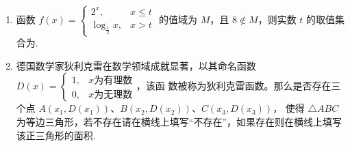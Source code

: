 \documentclass[a4paper,11pt]{article}
\begin{document}
\begin{enumerate}
\ifanswer
\solbegin
{}
\solend

\fi

\item 函数 $f(x)=\begin{cases}2^x, & x\leqslant t\\ \log_\frac12x, & x>t\end{cases}$ 的值域为 $M$，且 $8\notin M$，则实数 $t$ 的取值集合为\blankline[4.4em].

\ifanswer
\solbegin
\step{当 $x\leqslant t$ 时，函数 $f(x)=2^x$ 在 $(-\infty,t]$ 严格增，}
\step{若 $8\notin M$，则满足条件 $\begin{cases}2^t<8\\ \log_\frac12t\leqslant8\end{cases}\Rightarrow\dfrac1{256}\leqslant t<3$，故实数 $t$ 的取值集合为 $\left[\dfrac1{256},3\right)$.}
\solend

\fi

\item 德国数学家狄利克雷在数学领域成就显著，以其命名函数 $D(x)=\begin{cases}1, & x\text{为有理数}\\ 0, & x\text{为无理数}\end{cases}$，该函
数被称为狄利克雷函数。那么是否存在三个点 $A(x_1,D(x_1))$、$B(x_2,D(x_2))$、$C(x_3,D(x_3))$，
使得 $\triangle ABC$ 为等边三角形，若不存在请在横线上填写“不存在”，如果存在则在横线上填写
该正三角形的面积\blankline[4.4em].


\end{enumerate}
\end{document}
